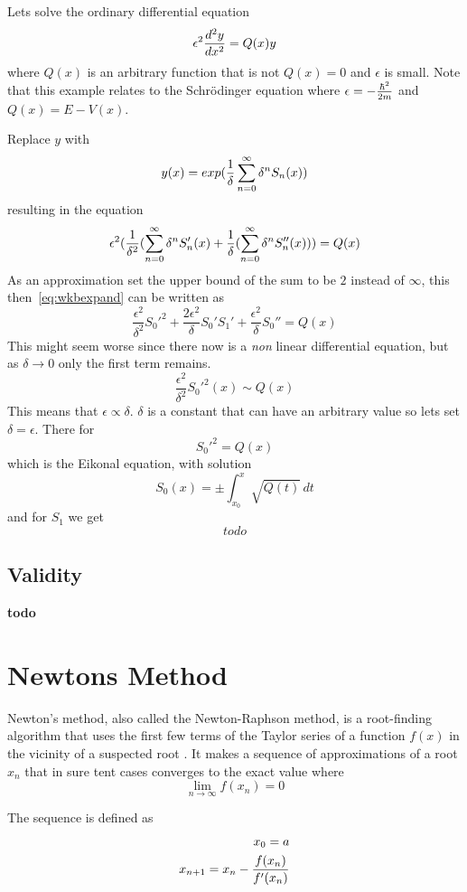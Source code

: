\documentclass[11pt,DIV=10,final]{scrreprt} %
\begin{document}
Lets solve the ordinary differential equation
\[
  \epsilon^{2} {d^{2}y \over dx^{2}} = Q(x)y
\]
where $Q(x)$ is an arbitrary function that is not $Q(x) = 0$ and $\epsilon$ is small. Note that this example relates to the Schrödinger equation
where $\epsilon = -{\hbar^{2} \over 2m}$ and $Q(x) = E - V(x)$.

Replace $y$ with
\[
  y(x) = exp({1 \over \delta} \sum_{n=0}^{\infty}{\delta^{n}S_{n}(x)})
\]
resulting in the equation
\begin{equation}
\label{eq:wkbexpand}
  \epsilon^{2}({1 \over \delta^{2}}(\sum_{n=0}^{\infty}{\delta^{n}S'_{n}(x)} + {1 \over \delta}(\sum_{n=0}^{\infty}{\delta^{n}S''_{n}(x)})) = Q(x)
\end{equation}
As an approximation set the upper bound of the sum to be $2$ instead of $\infty$, this then~\ref{eq:wkbexpand} can be written as
\[
 \frac{\epsilon^2}{\delta^2}S_0'^2 + \frac{2\epsilon^2}{\delta}S_0'S_1' + \frac{\epsilon^2}{\delta}S_0'' = Q(x)
\]
This might seem worse since there now is a \emph{non} linear differential equation, but as $\delta \rightarrow 0$ only the first term remains.
\[
\frac{\epsilon^2}{\delta^2}S_0'^2(x) \sim Q(x)
\]
This means that $\epsilon \propto \delta$. $\delta$ is a constant that can have an arbitrary value so lets set $\delta = \epsilon$.
There for
\[
  S_{0}'^{2} = Q(x)
\]
which is the Eikonal equation, with solution
\[
S_0(x) = \pm \int_{x_0}^x \sqrt{Q(t)}\,dt
\]
and for $S_{1}$ we get
\[
todo
\]



\subsection{Validity}
\label{meth:wkb:valid}
\textbf{todo}





\section{Newtons Method}
Newton's method, also called the Newton-Raphson method, is a root-finding algorithm that uses the first few terms of the Taylor series of a function $f(x)$ in the vicinity of a suspected root
\citep{math:newton}. It makes a sequence of approximations of a root $x_{n}$ that in sure tent cases converges to the exact value where
\[
  \lim _{n \to \infty}f(x_{n}) = 0
\]

The sequence is defined as
\begin{align*}
  x_{0}=a \\*
  x_{n+1}=x_{n}-{f(x_{n}) \over f'(x_{n})}
\end{align*}
\end{document}
